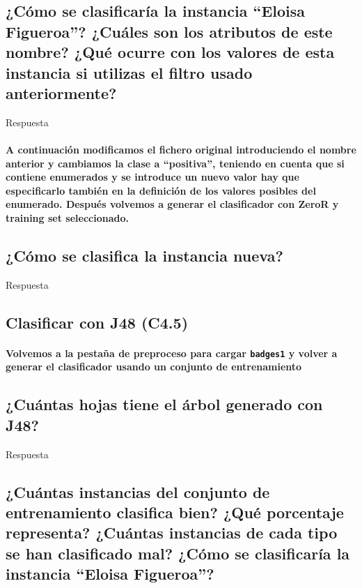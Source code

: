 \documentclass[12pt]{article}
\begin{document}
\subsection{\small ¿Cómo se clasificaría la instancia ``Eloisa Figueroa''?
¿Cuáles son los atributos de este nombre? ¿Qué ocurre con los valores de esta
instancia si utilizas el filtro usado anteriormente?}

Respuesta

\paragraph{\small A continuación modificamos el fichero original introduciendo
el nombre anterior y cambiamos la clase a ``positiva'', teniendo en cuenta que
si contiene enumerados y se introduce un nuevo valor hay que especificarlo
también en la definición de los valores posibles del enumerado. Después
volvemos a generar el clasificador con ZeroR y training set seleccionado.}

\subsection{\small ¿Cómo se clasifica la instancia nueva?}

Respuesta

\newpage

\begin{center}
\section{Clasificar con J48 (C4.5)}
\end{center}

\paragraph{\small Volvemos a la pestaña de preproceso para cargar
\texttt{badges1} y volver a generar el clasificador usando un conjunto de
entrenamiento}

\subsection{\small ¿Cuántas hojas tiene el árbol generado con J48?}

Respuesta

\subsection{\small ¿Cuántas instancias del conjunto de entrenamiento clasifica
bien? ¿Qué porcentaje representa? ¿Cuántas instancias de cada tipo se han
clasificado mal? ¿Cómo se clasificaría la instancia ``Eloisa Figueroa''?}
\end{document}
